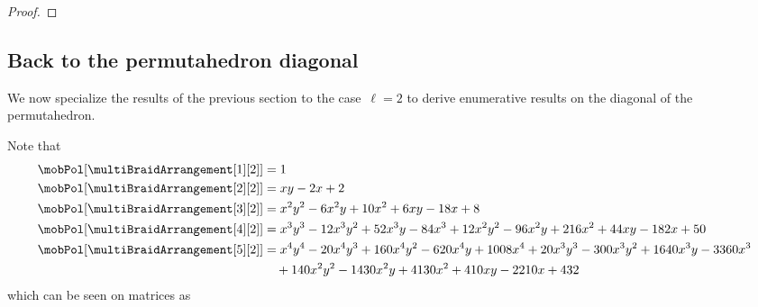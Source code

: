 \begin{proof}
\end{proof}

\subsection{Back to the permutahedron diagonal} 
\label{subsec:enumerationDiagonal}

We now specialize the results of the previous section to the case~$\ell = 2$ to derive enumerative results on the diagonal of the permutahedron.

Note that
\begin{align*}
\mobPol[{\multiBraidArrangement[1][2]}] & = 1 \\
\mobPol[{\multiBraidArrangement[2][2]}] & = x y - 2 x + 2 \\
\mobPol[{\multiBraidArrangement[3][2]}] & = x^2 y^2 - 6 x^2 y + 10 x^2 + 6 x y - 18 x + 8 \\
\mobPol[{\multiBraidArrangement[4][2]}] & = x^3 y^3 - 12 x^3 y^2 + 52 x^3 y - 84 x^3 + 12 x^2 y^2 - 96 x^2 y + 216 x^2 + 44 x y - 182 x + 50 \\
\mobPol[{\multiBraidArrangement[5][2]}] & = x^4 y^4 - 20 x^4 y^3 + 160 x^4 y^2 - 620 x^4 y + 1008 x^4 + 20 x^3 y^3 - 300 x^3 y^2 + 1640 x^3 y - 3360 x^3 \\ & \quad+ 140 x^2 y^2 - 1430 x^2 y + 4130 x^2 + 410 x y - 2210 x + 432
\end{align*}
which can be seen on matrices as

